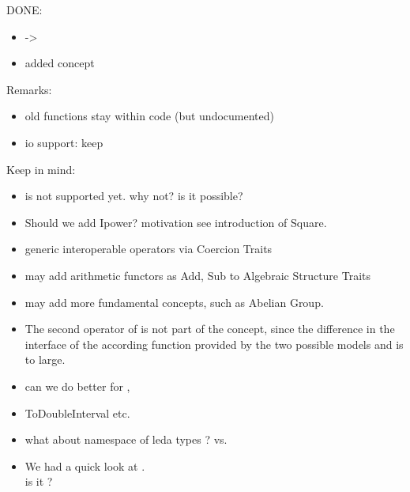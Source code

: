 DONE:
\begin{itemize}
\item {} -> 
\item added concept 
\end{itemize}

Remarks:
\begin{itemize}
\item old functions stay within code (but undocumented)
\item io support: keep  
\end{itemize}

Keep in mind: 
\begin{itemize}
\item {} is not supported yet. why not? is it possible?  
\item Should we add Ipower? motivation see introduction of Square. 
\item generic interoperable operators via Coercion Traits
\item may add arithmetic functors as Add, Sub to Algebraic Structure Traits
\item may add more fundamental concepts, such as Abelian Group.
\item The second operator of  is not 
        part of the concept, since the difference in the interface of the 
        according function provided by the two possible models 
        and  is to large.  
\item can we do better for , 
\item ToDoubleInterval etc. 
\item what about namespace of leda types ? 
      vs. 
\item We had a quick look at . \\ 
      is it ?
\end{itemize}

